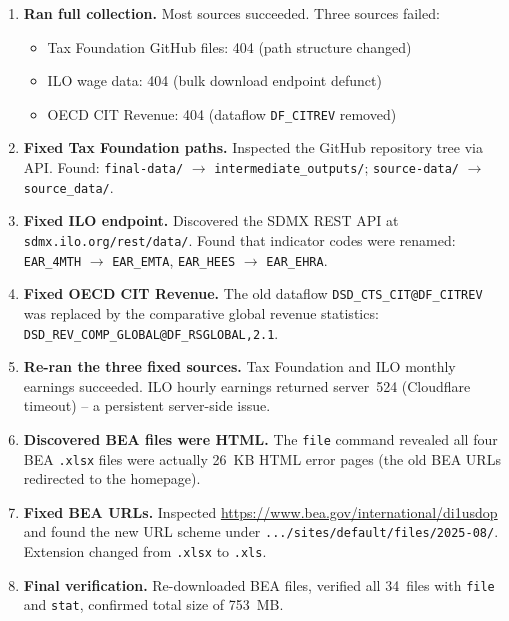\documentclass[12pt,a4paper]{article}
\begin{document}
\begin{enumerate}
    \item \textbf{Ran full collection.}
    Most sources succeeded.
    Three sources failed:
    \begin{itemize}
        \item Tax Foundation GitHub files: 404 (path structure changed)
        \item ILO wage data: 404 (bulk download endpoint defunct)
        \item OECD CIT Revenue: 404 (dataflow \texttt{DF\_CITREV} removed)
    \end{itemize}

    \item \textbf{Fixed Tax Foundation paths.}
    Inspected the GitHub repository tree via API.
    Found: \texttt{final-data/} $\rightarrow$ \texttt{intermediate\_outputs/}; \texttt{source-data/} $\rightarrow$ \texttt{source\_data/}.

    \item \textbf{Fixed ILO endpoint.}
    Discovered the SDMX REST API at \texttt{sdmx.ilo.org/rest/data/}.
    Found that indicator codes were renamed: \texttt{EAR\_4MTH} $\rightarrow$ \texttt{EAR\_EMTA}, \texttt{EAR\_HEES} $\rightarrow$ \texttt{EAR\_EHRA}.

    \item \textbf{Fixed OECD CIT Revenue.}
    The old dataflow \texttt{DSD\_CTS\_CIT@DF\_CITREV} was replaced by the comparative global revenue statistics: \texttt{DSD\_REV\_COMP\_GLOBAL@DF\_RSGLOBAL,2.1}.

    \item \textbf{Re-ran the three fixed sources.}
    Tax Foundation and ILO monthly earnings succeeded.
    ILO hourly earnings returned server~524 (Cloudflare timeout) -- a persistent server-side issue.

    \item \textbf{Discovered BEA files were HTML.}
    The \texttt{file} command revealed all four BEA \texttt{.xlsx} files were actually 26~KB HTML error pages (the old BEA URLs redirected to the homepage).

    \item \textbf{Fixed BEA URLs.}
    Inspected \url{https://www.bea.gov/international/di1usdop} and found the new URL scheme under \texttt{.../sites/default/files/2025-08/}.
    Extension changed from \texttt{.xlsx} to \texttt{.xls}.

    \item \textbf{Final verification.}
    Re-downloaded BEA files, verified all 34~files with \texttt{file} and \texttt{stat}, confirmed total size of 753~MB.
\end{enumerate}
\end{document}
